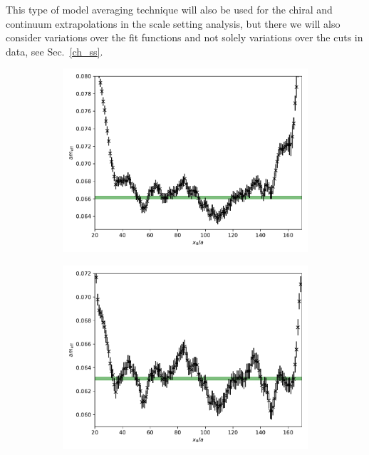 This type of model averaging technique will also be used for the chiral and continuum extrapolations in the scale setting analysis, but there we will also consider variations over the fit functions and not solely variations over the cuts in data, see Sec.~\ref{ch_ss}.

\begin{figure}
    \centering
    \begin{subfigure}{.49\textwidth}
    	\includegraphics[width=\textwidth]{./cap3/figs/J501_meff.pdf}
    	\caption{}
    \end{subfigure}
    \begin{subfigure}{.49\textwidth}
    	\includegraphics[width=\textwidth]{./cap3/figs/J501_meff_tm.pdf}

\end{subfigure}
\end{figure}
